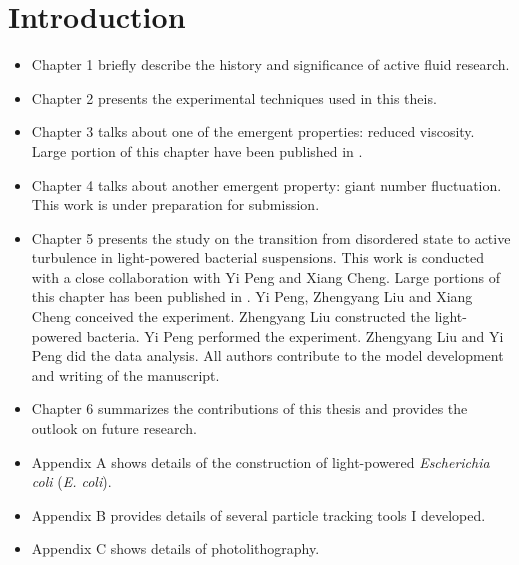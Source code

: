 



\chapter{Introduction}
\label{intro_chapter}

\begin{itemize}

\item Chapter 1 briefly describe the history and significance of active fluid research.

\item Chapter 2 presents the experimental techniques used in this theis.

\item Chapter 3 talks about one of the emergent properties: reduced viscosity. Large portion of  this chapter have been published in \cite{Liu2019}.

\item Chapter 4 talks about another emergent property: giant number fluctuation. This work is under preparation for submission.

\item Chapter 5 presents the study on the transition from disordered state to active turbulence in light-powered bacterial suspensions. This work is conducted with a close collaboration with Yi Peng and Xiang Cheng. Large portions of this chapter has been published in \cite{Peng2020}. Yi Peng, Zhengyang Liu and Xiang Cheng conceived the experiment. Zhengyang Liu constructed the light-powered bacteria. Yi Peng performed the experiment. Zhengyang Liu and Yi Peng did the data analysis. All authors contribute to the model development and writing of the manuscript.

\item Chapter 6 summarizes the contributions of this thesis and provides the outlook on future research.

\item Appendix A shows details of the construction of light-powered \textit{Escherichia coli} (\textit{E. coli}).

\item Appendix B provides details of several particle tracking tools I developed.

\item Appendix C shows details of photolithography.

\end{itemize}


